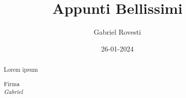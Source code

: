 \documentclass[a4paper,11pt]{report}
\begin{document}
\title{Appunti Bellissimi}
\author{Gabriel Rovesti}
\date{26-01-2024}

\maketitle

\begin{abstract}
	Lorem ipsum
	\begin{flushright}
		Firma \\
		\emph{Gabriel}
	\end{flushright}
	
	
\end{abstract}

\hypersetup{linkcolor=black}
\tableofcontents
\listoffigures

\newpage

\hypersetup{linkcolor=blue, urlcolor=blue}



\begin{appendices}



\end{appendices}

	
\end{document}
